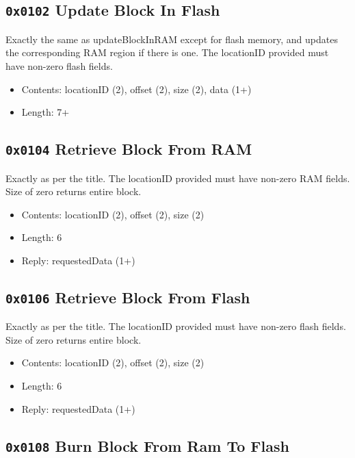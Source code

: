 \documentclass[12pt,a4paper,titlepage]{article}
\begin{document}
\begin{titlepage}
\begin{center}
\subsection{\texttt{0x0102} Update Block In Flash}

Exactly the same as updateBlockInRAM except for flash memory, and updates the corresponding RAM region if there is one. The locationID provided must have non-zero flash fields.

\begin{itemize}
\item Contents: locationID (2),  offset (2), size (2), data (1+)
\item Length: 7+
\end{itemize}


\subsection{\texttt{0x0104} Retrieve Block From RAM}

Exactly as per the title. The locationID provided must have non-zero RAM fields. Size of zero returns entire block.

\begin{itemize}
\item Contents: locationID (2),  offset (2), size (2)
\item Length: 6
\item Reply: requestedData (1+)
\end{itemize}


\newpage
\subsection{\texttt{0x0106} Retrieve Block From Flash}

Exactly as per the title. The locationID provided must have non-zero flash fields. Size of zero returns entire block.

\begin{itemize}
\item Contents: locationID (2),  offset (2), size (2)
\item Length: 6
\item Reply: requestedData (1+)
\end{itemize}


\subsection{\texttt{0x0108} Burn Block From Ram To Flash}


\end{center}
\end{titlepage}
\end{document}
